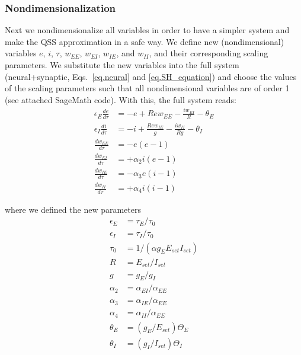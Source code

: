 \documentclass[twocolumn]{article}
\newcommand{\EE}{\mathit{EE}}
\newcommand{\EI}{\mathit{EI}}
\newcommand{\IE}{\mathit{IE}}
\newcommand{\II}{\mathit{II}}
\newcommand{\set}{\mathit{set}}
\begin{document}
\subsubsection{Nondimensionalization}

Next we nondimensionalize all variables in order to have a simpler system and make the QSS approximation in a safe way. We define new (nondimensional) variables $e$, $i$, $\tau$, $w_{\EE}$, $w_{\EI}$, $w_{\IE}$, and $w_{\II}$, and their corresponding scaling parameters. We substitute the new variables into the full system (neural+synaptic, Eqs.\ \ref{eq.neural} and \ref{eq.SH_equation}) and choose the values of the scaling parameters such that all nondimensional variables are of order 1 (see attached SageMath code). With this, the full system reads:
\begin{equation}
\begin{aligned}
\epsilon_E \frac{de}{d\tau} & = -e + R e w_{\EE} - \frac{i w_{\EI}}{R} - \theta_E \\
\epsilon_I \frac{di}{d\tau} & = -i + \frac{R e w_{\IE}}{g} - \frac{i w_{\II}}{Rg} - \theta_I \\
\frac{dw_{\EE}}{d\tau} & = -e(e-1) \\
\frac{dw_{\EI}}{d\tau} & = +\alpha_2 i(e-1) \\
\frac{dw_{\IE}}{d\tau} & = -\alpha_3 e(i-1) \\
\frac{dw_{\II}}{d\tau} & = +\alpha_4 i(i-1)
\end{aligned}
\label{eq.SH_full_norm}
\end{equation}

\noindent where we defined the new parameters
\begin{displaymath}
\begin{aligned}
\epsilon_E & = \tau_E/\tau_0 \\
\epsilon_I & = \tau_I/\tau_0 \\
\tau_0 & = 1/(\alpha g_E E_{\set} I_{\set}) \\
R & = E_{\set}/I_{\set} \\
g & = g_E/g_I \\
\alpha_2 & = \alpha_{\EI}/\alpha_{\EE} \\
\alpha_3 & = \alpha_{\IE}/\alpha_{\EE} \\
\alpha_4 & = \alpha_{\II}/\alpha_{\EE} \\
\theta_E & = (g_E/E_{\set}) \Theta_E \\
\theta_I & = (g_I/I_{\set}) \Theta_I
\end{aligned}
\end{displaymath}
\end{document}
